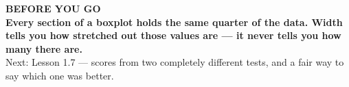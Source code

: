 \documentclass[aspectratio=169, 11pt]{beamer}
\begin{document}
{
\begin{frame}[plain]
  \vspace{1.5cm}\hspace{0.8cm}%
  \begin{minipage}{0.86\textwidth}
    {\color{goldacc}\bfseries\small BEFORE YOU GO}\\[0.7cm]
    {\color{white}\bfseries\Large Every section of a boxplot holds the same quarter of the data.
    Width tells you how stretched out those values are --- it never tells you how many there
    are.}\\[0.8cm]
    {\color{skymid}\small Next: Lesson 1.7 --- scores from two completely different tests, and
    a fair way to say which one was better.}
  \end{minipage}
\end{frame}
}
\end{document}
